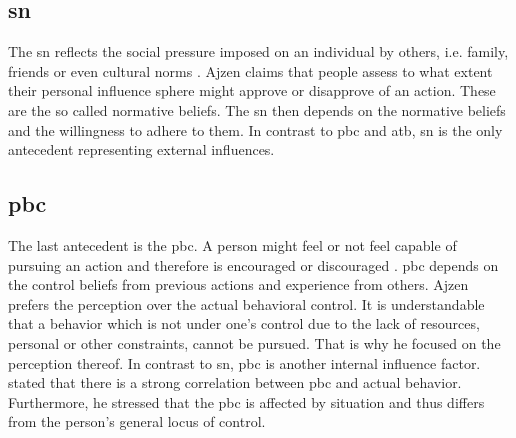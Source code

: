 \subsection{\acl{sn}}
The \ac{sn} reflects the social pressure imposed on an individual by others, i.e. family, friends or even cultural norms \citep{ajzen1991theory}. Ajzen claims that people assess to what extent their personal influence sphere might approve or disapprove of an action. These are the so called normative beliefs. The \ac{sn} then depends on the normative beliefs and the willingness to adhere to them.
In contrast to \ac{pbc} and \ac{atb}, \ac{sn} is the only antecedent representing external influences.

\subsection{\acl{pbc}}
The last antecedent is the \ac{pbc}. A person might feel or not feel capable of pursuing an action and therefore is encouraged or discouraged \citep{ajzen1988attitudes}. \ac{pbc} depends on the control beliefs from previous actions and experience from others.
Ajzen prefers the perception over the actual behavioral control. It is understandable that a behavior which is not under one's control due to the lack of resources, personal or other constraints, cannot be pursued. That is why he focused on the perception thereof. In contrast to \ac{sn}, \ac{pbc} is another internal influence factor.
\citet{ajzen1988attitudes} stated that there is a strong correlation between \ac{pbc} and actual behavior. Furthermore, he stressed that the \ac{pbc} is affected by situation and thus differs from the person's general locus of control.

